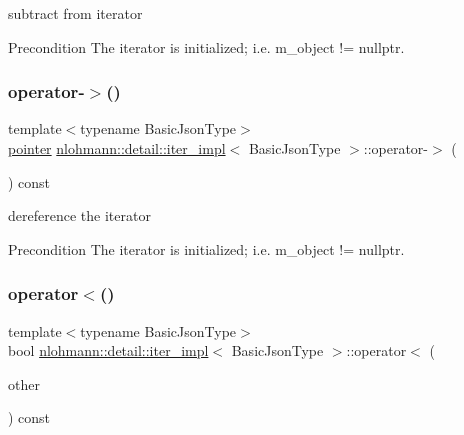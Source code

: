 subtract from iterator 

\begin{DoxyPrecond}{Precondition}
The iterator is initialized; i.\+e. {\ttfamily m\+\_\+object != nullptr}. 
\end{DoxyPrecond}
\mbox{\label{classnlohmann_1_1detail_1_1iter__impl_a6da3d2b34528aff328f3dcb513076dec}} 
\subsubsection{\texorpdfstring{operator-\/$>$()}{operator->()}}
{\footnotesize\ttfamily template$<$typename Basic\+Json\+Type$>$ \\
\hyperlink{classnlohmann_1_1detail_1_1iter__impl_a69e52f890ce8c556fd68ce109e24b360}{pointer} \hyperlink{classnlohmann_1_1detail_1_1iter__impl}{nlohmann\+::detail\+::iter\+\_\+impl}$<$ Basic\+Json\+Type $>$\+::operator-\/$>$ (\begin{DoxyParamCaption}{ }\end{DoxyParamCaption}) const\hspace{0.3cm}{\ttfamily [inline]}}



dereference the iterator 

\begin{DoxyPrecond}{Precondition}
The iterator is initialized; i.\+e. {\ttfamily m\+\_\+object != nullptr}. 
\end{DoxyPrecond}
\mbox{\label{classnlohmann_1_1detail_1_1iter__impl_a0d14cd76203e00bdcef6a64a5d055cc7}} 
\subsubsection{\texorpdfstring{operator$<$()}{operator<()}}
{\footnotesize\ttfamily template$<$typename Basic\+Json\+Type$>$ \\
bool \hyperlink{classnlohmann_1_1detail_1_1iter__impl}{nlohmann\+::detail\+::iter\+\_\+impl}$<$ Basic\+Json\+Type $>$\+::operator$<$ (\begin{DoxyParamCaption}\item[{const \hyperlink{classnlohmann_1_1detail_1_1iter__impl}{iter\+\_\+impl}$<$ Basic\+Json\+Type $>$ \&}]{other }\end{DoxyParamCaption}) const\hspace{0.3cm}{\ttfamily [inline]}}



